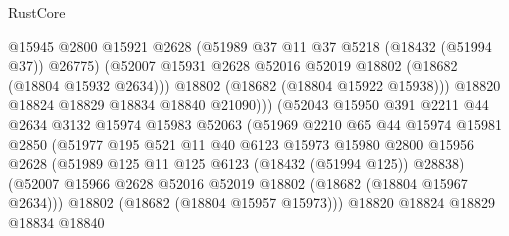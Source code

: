 \begin{lexlean}{RustCore}
\begin{coremodule}
                                  @15945
                                  @2800
                                  @15921
                                  @2628
                                  (@51989 @37 @11 @37 @5218 (@18432 (@51994 @37)) @26775)
                                  (@52007
                                    @15931
                                    @2628
                                    @52016
                                    @52019
                                    @18802
                                    (@18682 (@18804 @15932 @2634)))
                                  @18802
                                  (@18682 (@18804 @15922 @15938)))
                                @18820
                                @18824
                                @18829
                                @18834
                                @18840
                                @21090)))
                          (@52043
                            @15950
                            @391
                            @2211
                            @44
                            @2634
                            @3132
                            @15974
                            @15983
                            @52063
                            (@51969
                              @2210
                              @65
                              @44
                              @15974
                              @15981
                              @2850
                              (@51977
                                @195
                                @521
                                @11
                                @40
                                @6123
                                @15973
                                @15980
                                @2800
                                @15956
                                @2628
                                (@51989 @125 @11 @125 @6123 (@18432 (@51994 @125)) @28838)
                                (@52007
                                  @15966
                                  @2628
                                  @52016
                                  @52019
                                  @18802
                                  (@18682 (@18804 @15967 @2634)))
                                @18802
                                (@18682 (@18804 @15957 @15973)))
                              @18820
                              @18824
                              @18829
                              @18834
                              @18840

\end{coremodule}
\end{lexlean}
